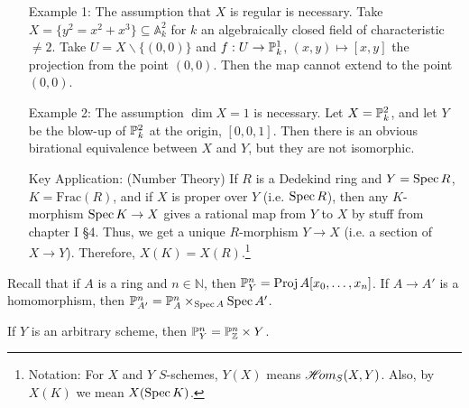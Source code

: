 \begin{itemize}
\item[Example 1:] The assumption that $X$ is regular is necessary.
Take $X=\{y^2=x^2+x^3\}\subseteq \mathbb{A}^2_k$ for $k$ an
algebraically closed field of characteristic $\not=2$.  Take
$U=X\smallsetminus \{(0,0)\}$ and $f:U\to \P^1_k$, $(x,y)\mapsto
[x,y]$ the projection from the point $(0,0)$.  Then the map cannot
extend to the point $(0,0)$.

\item[Example 2:] The assumption $\dim X=1$ is necessary.  Let
$X=\P^2_k$, and let $Y$ be the blow-up of $\P^2_k$ at the origin,
$[0,0,1]$.  Then there is an obvious birational equivalence
between $X$ and $Y$, but they are not isomorphic.

\item[Key Application:] (Number Theory)  If $R$ is a Dedekind ring
and $Y=\spec R$, $K=\text{Frac}(R)$, and if $X$ is proper over $Y$
(i.e. $\spec R$), then any $K$-morphism $\spec K \to X$ gives a
rational map from $Y$ to $X$ by stuff from chapter I \S 4.  Thus,
we get a unique $R$-morphism $Y\to X$ (i.e. a section of $X\to
Y$).  Therefore, $X(K)=X(R)$.\footnote{Notation: For $X$ and $Y$
$S$-schemes, $Y(X)$ means $\Hom_S(X,Y)$.  Also, by $X(K)$ we mean
$X(\spec K)$.}
\end{itemize}

Recall that if $A$ is a ring and $n\in \mathbb{N}$, then $\P^n_Y
=\proj A[x_0,\dots, x_n]$.  If $A\to A'$ is a homomorphism, then
$\P^n_{A'} = \P^n_A\times_{\spec A} \spec A'$.

\begin{definition}
If $Y$ is an arbitrary scheme, then $\P^n_Y=\P^n_{\Z}\times Y$.
\end{definition}


